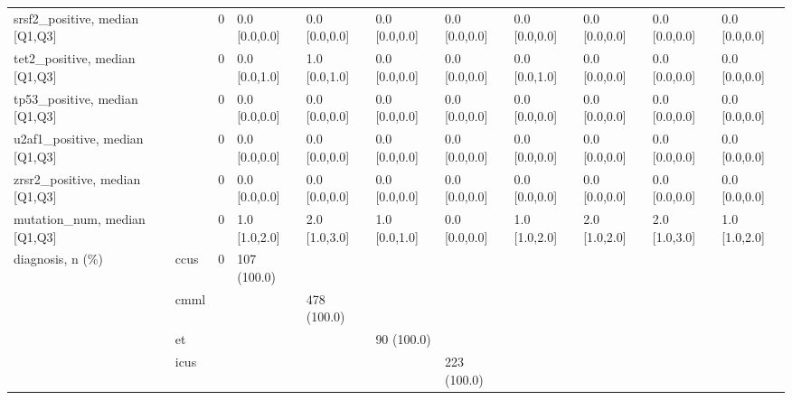 \begin{tabular}{lllllllllll}
srsf2\_positive, median [Q1,Q3] &    &                    0 &       0.0 [0.0,0.0] &      0.0 [0.0,0.0] &        0.0 [0.0,0.0] &       0.0 [0.0,0.0] &     0.0 [0.0,0.0] &     0.0 [0.0,0.0] &       0.0 [0.0,0.0] &        0.0 [0.0,0.0] \\
tet2\_positive, median [Q1,Q3] &    &                    0 &       0.0 [0.0,1.0] &      1.0 [0.0,1.0] &        0.0 [0.0,0.0] &       0.0 [0.0,0.0] &     0.0 [0.0,1.0] &     0.0 [0.0,0.0] &       0.0 [0.0,0.0] &        0.0 [0.0,0.0] \\
tp53\_positive, median [Q1,Q3] &    &                    0 &       0.0 [0.0,0.0] &      0.0 [0.0,0.0] &        0.0 [0.0,0.0] &       0.0 [0.0,0.0] &     0.0 [0.0,0.0] &     0.0 [0.0,0.0] &       0.0 [0.0,0.0] &        0.0 [0.0,0.0] \\
u2af1\_positive, median [Q1,Q3] &    &                    0 &       0.0 [0.0,0.0] &      0.0 [0.0,0.0] &        0.0 [0.0,0.0] &       0.0 [0.0,0.0] &     0.0 [0.0,0.0] &     0.0 [0.0,0.0] &       0.0 [0.0,0.0] &        0.0 [0.0,0.0] \\
zrsr2\_positive, median [Q1,Q3] &    &                    0 &       0.0 [0.0,0.0] &      0.0 [0.0,0.0] &        0.0 [0.0,0.0] &       0.0 [0.0,0.0] &     0.0 [0.0,0.0] &     0.0 [0.0,0.0] &       0.0 [0.0,0.0] &        0.0 [0.0,0.0] \\
mutation\_num, median [Q1,Q3] &    &                    0 &       1.0 [1.0,2.0] &      2.0 [1.0,3.0] &        1.0 [0.0,1.0] &       0.0 [0.0,0.0] &     1.0 [1.0,2.0] &     2.0 [1.0,2.0] &       2.0 [1.0,3.0] &        1.0 [1.0,2.0] \\
diagnosis, n (\%) & ccus &                    0 &         107 (100.0) &                    &                      &                     &                   &                   &                     &                      \\
                 & cmml &                      &                     &        478 (100.0) &                      &                     &                   &                   &                     &                      \\
                 & et &                      &                     &                    &           90 (100.0) &                     &                   &                   &                     &                      \\
                 & icus &                      &                     &                    &                      &         223 (100.0) &                   &                   &                     &                      \\

\end{tabular}
